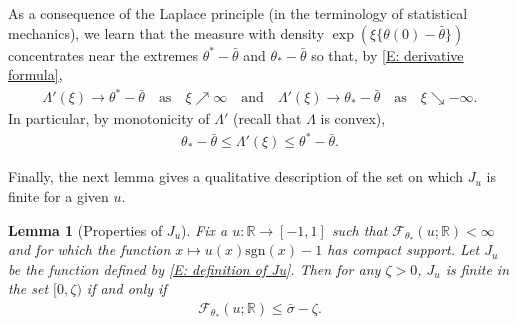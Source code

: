 \documentclass[10pt,a4paper]{amsart}
\newtheorem{lemma}{Lemma}
\begin{document}
As a consequence of the Laplace principle (in the terminology of statistical mechanics), we learn that the measure with density $ \exp ( \xi \{ \theta(0) - \bar{\theta} \} ) $ concentrates near the extremes $ \theta^* - \bar{\theta} $ and $ \theta_{*} - \bar{\theta} $ so that, by \eqref{E: derivative formula},
	\begin{align} \label{E: asymptotics derivative lambda}
		\Lambda ' ( \xi ) \rightarrow \theta^* - \bar{\theta} \quad \text{as} \quad \xi \nearrow \infty
		\quad \text{and} \quad
		\Lambda ' ( \xi ) \rightarrow \theta_{*} - \bar{\theta} \quad \text{as} \quad \xi \searrow -\infty .
	\end{align}
In particular, by monotonicity of $\Lambda'$ (recall that $ \Lambda $ is convex),
	\begin{align*}
		\theta_{*} - \bar{\theta} \leq \Lambda'(\xi) \leq \theta^{*} - \bar{\theta}.
	\end{align*}

Finally, the next lemma gives a qualitative description of the set on which $J_{u}$ is finite for a given $u$.
	
\begin{lemma}[Properties of $ J_{ u } $] \label{L: finiteness trick} Fix a $u : \mathbb{R} \to [-1,1]$ such that $\mathscr{F}_{\theta_{*}}(u;\mathbb{R}) < \infty$ and for which the function $x \mapsto u(x) \text{sgn}(x) - 1$ has compact support.  Let $ J_{ u } $ be the function defined by \eqref{E: definition of Ju}.  Then for any $\zeta > 0$, $J_{u}$ is finite in the set $[0,\zeta)$ if and only if
		\begin{align*}
			\mathscr{F}_{\theta_{*}}(u;\mathbb{R}) \leq \bar{\sigma} - \zeta.
		\end{align*}
	\end{lemma}
\end{document}
